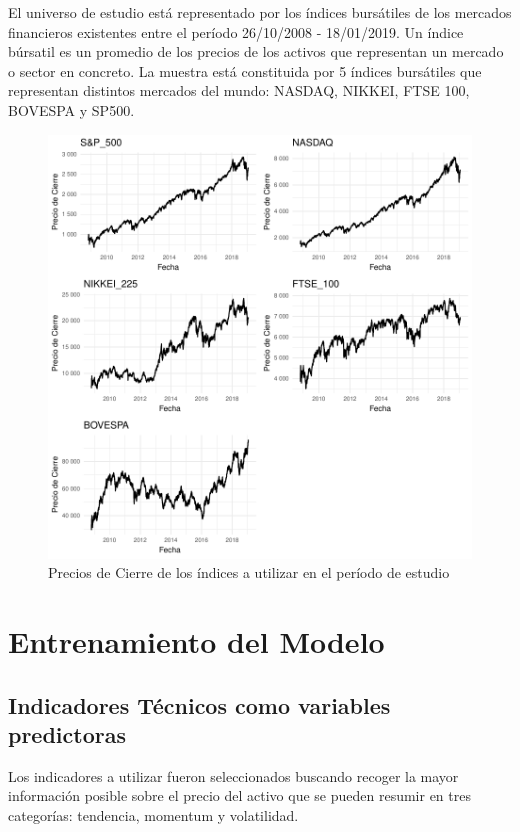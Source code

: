\documentclass[a4paper,12pt]{Latex/Classes/PhDthesisPSnPDF}
\begin{document}
El universo de estudio está representado por los índices bursátiles de los mercados financieros existentes entre el período 26/10/2008 - 18/01/2019. Un índice búrsatil es un promedio de los precios de los activos que representan un mercado o sector en concreto. La muestra está constituida por 5 índices bursátiles que representan distintos mercados del mundo: NASDAQ, NIKKEI, FTSE 100, BOVESPA y SP500.


\begin{figure}[H]
\centering
\includegraphics{main-002}
\caption{Precios de Cierre de los índices a utilizar en el período de estudio}
\end{figure}

\section{Entrenamiento del Modelo}

\subsection{Indicadores Técnicos como variables predictoras}

Los indicadores a utilizar fueron seleccionados buscando recoger la mayor información posible sobre el precio del activo que se pueden resumir en tres categorías: tendencia, momentum y volatilidad.
\end{document}
